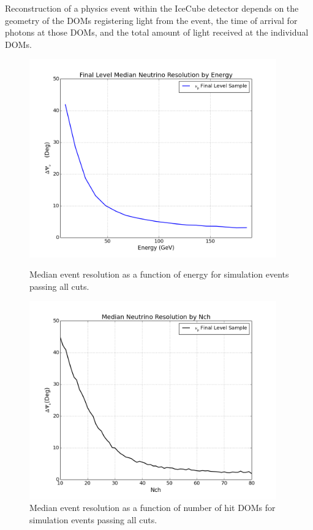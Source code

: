 \documentclass{gatech-thesis}
\begin{document}
Reconstruction of a physics event within the IceCube detector depends on the geometry of the DOMs registering light from the event, the time of arrival for photons at those DOMs, and the total amount of light received at the individual DOMs.


\begin{figure}[ht]
\centering
\begin{minipage}[b]{0.45\linewidth}
\includegraphics[width=0.95\textwidth]{FinalLevel_NeutrinoResolutionByEnergy_JustGENIE.png}
\caption{Median event resolution as a function of energy for simulation events passing all cuts.}
\label{fig:EventSampleRes_Energy}
\end{minipage}
\quad
\begin{minipage}[b]{0.45\linewidth}

\includegraphics[width=0.95\textwidth]{GENIE_FinalLevel_NeutrinoResolutionByNch.png}

\caption{Median event resolution as a function of number of hit DOMs for simulation events passing all cuts.}
\label{fig:EventSampleRes_Nch}
\end{minipage}
\end{figure}
\end{document}
